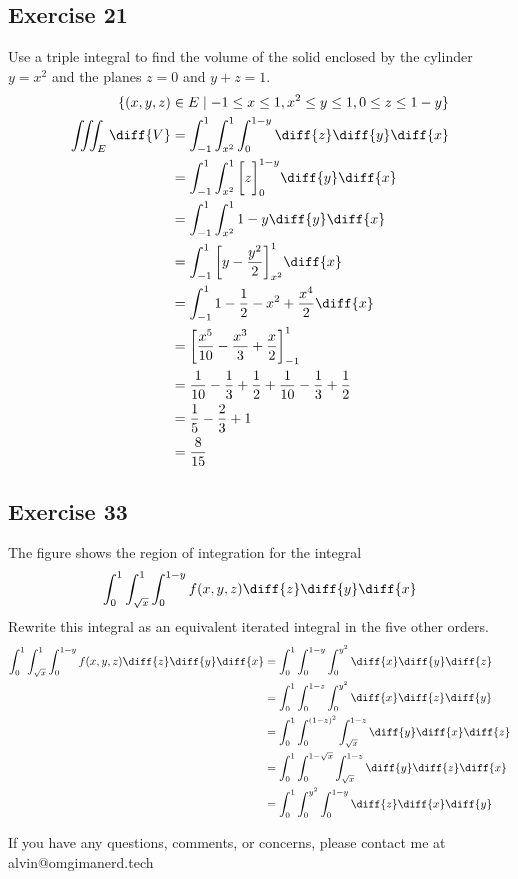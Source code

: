 \documentclass{math}
\begin{document}
\subsection*{Exercise 21}
Use a triple integral to find the volume of the solid enclosed by the cylinder
\( y = x^2 \) and the planes \( z = 0 \) and \( y+z = 1 \).
\begin{align*}
  \{ (x,y,z)&\in E\mid -1\le x\le 1, x^2\le y\le 1, 0\le z\le1-y\} \\
  \iiint_{E}\diff{V} &= \int_{-1}^{1}\int_{x^2}^{1}\int_{0}^{1-y}
    \diff{z}\diff{y}\diff{x} \\
  &= \int_{-1}^{1}\int_{x^2}^{1}\bigg[z\bigg]_{0}^{1-y}\diff{y}\diff{x} \\
  &= \int_{-1}^{1}\int_{x^2}^{1}1-y\diff{y}\diff{x} \\
  &= \int_{-1}^{1}\bigg[y-\frac{y^2}{2}\bigg]_{x^2}^{1}\diff{x} \\
  &= \int_{-1}^{1}1-\frac{1}{2}-x^2+\frac{x^4}{2}\diff{x} \\
  &= \bigg[\frac{x^5}{10}-\frac{x^3}{3}+\frac{x}{2}\bigg]_{-1}^{1} \\
  &= \frac{1}{10}-\frac{1}{3}+\frac{1}{2}+
    \frac{1}{10}-\frac{1}{3}+\frac{1}{2} \\
  &= \frac{1}{5}-\frac{2}{3}+1 \\
  &= \frac{8}{15}
\end{align*}

\subsection*{Exercise 33}
The figure shows the region of integration for the integral
\[ \int_{0}^{1}\int_{\sqrt{x}}^{1}\int_{0}^{1-y}
  f(x,y,z)\diff{z}\diff{y}\diff{x} \]
Rewrite this integral as an equivalent iterated integral in the five other
orders.
\begin{align*}
  \int_{0}^{1}\int_{\sqrt{x}}^{1}\int_{0}^{1-y}
    f(x,y,z)\diff{z}\diff{y}\diff{x} &=
  \int_{0}^{1}\int_{0}^{1-y}\int_{0}^{y^2}\diff{x}\diff{y}\diff{z} \\
  &= \int_{0}^{1}\int_{0}^{1-z}\int_{0}^{y^2}\diff{x}\diff{z}\diff{y} \\
  &= \int_{0}^{1}\int_{0}^{(1-z)^2}\int_{\sqrt{x}}^{1-z}
    \diff{y}\diff{x}\diff{z} \\
  &= \int_{0}^{1}\int_{0}^{1-\sqrt{x}}\int_{\sqrt{x}}^{1-z}
    \diff{y}\diff{z}\diff{x} \\
  &= \int_{0}^{1}\int_{0}^{y^2}\int_{0}^{1-y}\diff{z}\diff{x}\diff{y} \\
\end{align*}

\begin{center}
  If you have any questions, comments, or concerns, please contact me at
  alvin@omgimanerd.tech
\end{center}
\end{document}
